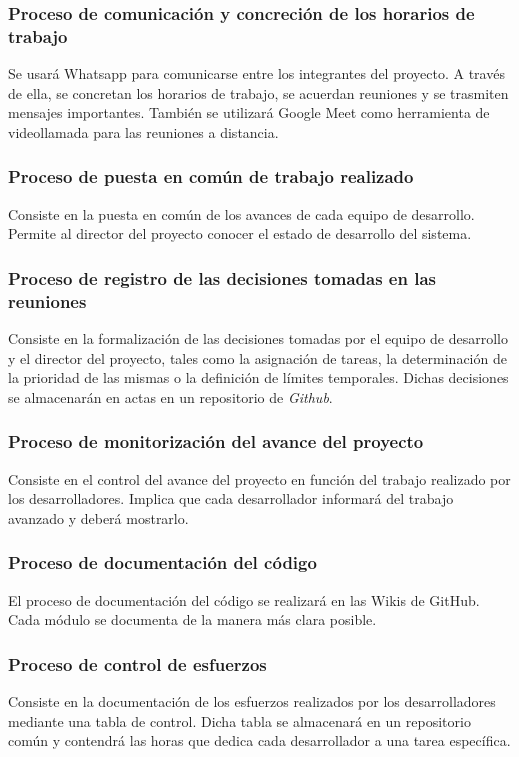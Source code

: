 \documentclass{article}
\begin{document}
\subsubsection{Proceso de comunicación y concreción de los horarios de trabajo} \label{P.EC.1}
Se usará Whatsapp para comunicarse entre los integrantes del proyecto. A través de ella, se concretan los horarios de trabajo, se acuerdan reuniones y se trasmiten mensajes importantes. También se utilizará Google Meet como herramienta de videollamada para las reuniones a distancia. 

\subsubsection{Proceso de puesta en común de trabajo realizado} \label{P.EC.2}
Consiste en la puesta en común de los avances de cada equipo de desarrollo. Permite al director del proyecto conocer el estado de desarrollo del sistema.

\subsubsection{Proceso de registro de las decisiones tomadas en las reuniones} \label{P.EC.3}
Consiste en la formalización de las decisiones tomadas por el equipo de desarrollo y el director del proyecto, tales como la asignación de tareas, la determinación de la prioridad de las mismas o la definición de límites temporales. Dichas decisiones se almacenarán en actas en un repositorio de \textit{Github}.

\subsubsection{Proceso de monitorización del avance del proyecto} \label{P.EC.4}
Consiste en el control del avance del proyecto en función del trabajo realizado por los desarrolladores. Implica que cada desarrollador informará del trabajo avanzado y deberá mostrarlo.

\subsubsection{Proceso de documentación del código} \label{P.EC.5}
El proceso de documentación del código se realizará en las Wikis de GitHub. Cada módulo se documenta de la manera más clara posible.

\subsubsection{Proceso de control de esfuerzos} \label{P.EC.6}
Consiste en la documentación de los esfuerzos realizados por los desarrolladores mediante una tabla de control. Dicha tabla se almacenará en un repositorio común y contendrá las horas que dedica cada desarrollador a una tarea específica.
\end{document}
